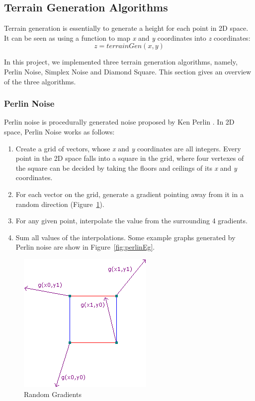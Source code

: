 \subsection{Terrain Generation Algorithms}
Terrain generation is essentially to generate a height for each point in 2D space. It can be seen as using a function to map \textit{x} and \textit{y} coordinates into \textit{z} coordinates: \[z=terrainGen(x, y)\]

In this project, we implemented three terrain generation algorithms, namely, Perlin Noise, Simplex Noise and Diamond Square. This section gives an overview of the three algorithms.

\subsubsection{Perlin Noise}
Perlin noise is procedurally generated noise proposed by Ken Perlin \cite{perlin:2002}. In 2D space, Perlin Noise works as follows:
\begin{enumerate}
	\item Create a grid of vectors, whose \textit{x} and \textit{y} coordinates are all integers. Every point in the 2D space falls into a square in the grid, where four vertexes of the square can be decided by taking the floors and ceilings of its \textit{x} and \textit{y} coordinates.
	\item For each vector on the grid, generate a gradient pointing away from it in a random direction (Figure~\ref{fig:randomGradients}).
	\item For any given point, interpolate the value from the surrounding 4 gradients.
	\item Sum all values of the interpolations. Some example graphs generated by Perlin noise are show in Figure~\ref{fig:perlinEg}.
\end{enumerate}
\begin{figure}
	\center
	\includegraphics[scale=0.5]{images/gradients.png}
	\caption{Random Gradients}
	\label{fig:randomGradients}
\end{figure}
